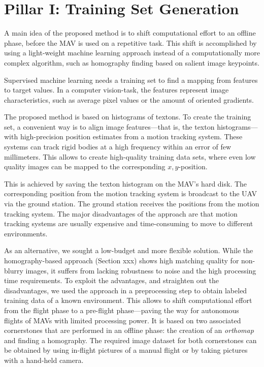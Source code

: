 \section{Pillar I: Training Set Generation}
\label{sec:mapping}

A main idea of the proposed method is to shift computational effort to
an offline phase, before the MAV is used on a repetitive task. This
shift is accomplished by using a light-weight machine learning
approach instead of a computationally more complex algorithm, such as
homography finding based on salient image keypoints.

Supervised machine learning needs a training set to find a mapping
from features to target values. In a computer vision-task, the
features represent image characteristics, such as average pixel values
or the amount of oriented gradients.

The proposed method is based on
histograms of textons. To create the training set, a convenient way is
to align image features---that is, the texton histograms---with
high-precision position estimates from a motion tracking system. 
These
systems can track rigid bodies at a high frequency within an error of
few millimeters. This allows to create high-quality training data
sets, where even low quality images can be mapped to the corresponding
$x,y$-position. 

This is achieved by saving the texton histogram on the MAV’s hard disk. The corresponding position from the motion tracking system is broadcast to the UAV via the ground station. The ground station receives the positions from the motion tracking system. 
The major disadvantages of the approach are that
motion tracking systems are usually expensive and time-consuming to
move to different environments.

As an alternative, we sought a low-budget and more flexible
solution. While the homography-based approach (Section xxx) shows high matching quality
for non-blurry images, it suffers from lacking robustness to noise
and the high processing time requirements. To exploit the advantages,
and straighten out the disadvantages, we used the approach in a preprocessing
step to obtain labeled training data of a known environment. This
allows to shift computational effort from the flight phase to a
pre-flight phase---paving the way for autonomous flights of MAVs with
limited processing power. It is based on two associated cornerstones
that are performed in an offline phase: the creation of an
\emph{orthomap} and finding a homography. The required image dataset
for both cornerstones can be obtained by using in-flight pictures of a
manual flight or by taking pictures with a hand-held camera.

